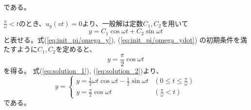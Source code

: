 \documentclass[a4paper]{jsarticle}
\begin{document}
である。\par
$\frac{\pi}{\omega} < t$のとき、$u_g(vt) = 0$より、一般解は定数$C_1, C_2$を用いて
\begin{equation}
  y = C_1 \cos \omega t + C_2 \sin \omega t
\end{equation}
と表せる。式(\ref{eq:init_pi/omega_y}), (\ref{eq:init_pi/omega_ydot})
の初期条件を満たすように$C_1,C_2$を定めると、
\begin{equation}
  \label{eq:solution_2}
  y = \frac{\pi}{2} \cos \omega t
\end{equation}
を得る。
式(\ref{eq:solution_1}), (\ref{eq:solution_2})より、
\begin{equation}
  y =
  \begin{cases}
    y = \frac{1}{2} \omega t \cos \omega t - \frac{1}{2}\sin \omega t
     & \left(0 \leq t \leq \frac{\pi}{\omega}\right) \\
    y = \frac{\pi}{2} \cos \omega t
     & \left(\frac{\pi}{\omega} < t\right)
  \end{cases}
\end{equation}
である。
\end{document}
